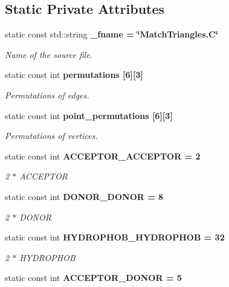 \subsection*{Static Private Attributes}
\begin{CompactItemize}
\item 
static const std::string \bf{\_\-fname} = \char`\"{}Match\-Triangles.C\char`\"{}\label{classSimSite3D_1_1MatchTriangles_263da86497b71a67e4cb0b14356e830d}

\begin{CompactList}\small\item\em Name of the source file. \item\end{CompactList}\item 
static const int \bf{permutations} [6][3]
\begin{CompactList}\small\item\em Permutations of edges. \item\end{CompactList}\item 
static const int \bf{point\_\-permutations} [6][3]
\begin{CompactList}\small\item\em Permutations of vertices. \item\end{CompactList}\item 
static const int \bf{ACCEPTOR\_\-ACCEPTOR} = 2\label{classSimSite3D_1_1MatchTriangles_987dee7263175dc5dac58309ca26d4eb}

\begin{CompactList}\small\item\em 2 $\ast$ ACCEPTOR \item\end{CompactList}\item 
static const int \bf{DONOR\_\-DONOR} = 8\label{classSimSite3D_1_1MatchTriangles_b78b92259f4ef3245675fdf17a21f6c9}

\begin{CompactList}\small\item\em 2 $\ast$ DONOR \item\end{CompactList}\item 
static const int \bf{HYDROPHOB\_\-HYDROPHOB} = 32\label{classSimSite3D_1_1MatchTriangles_ff621328272ce0e2c143efe4315feb9c}

\begin{CompactList}\small\item\em 2 $\ast$ HYDROPHOB \item\end{CompactList}\item 
static const int \bf{ACCEPTOR\_\-DONOR} = 5\label{classSimSite3D_1_1MatchTriangles_ade24f76f84d429853f48e41208db45e}


\end{CompactItemize}
